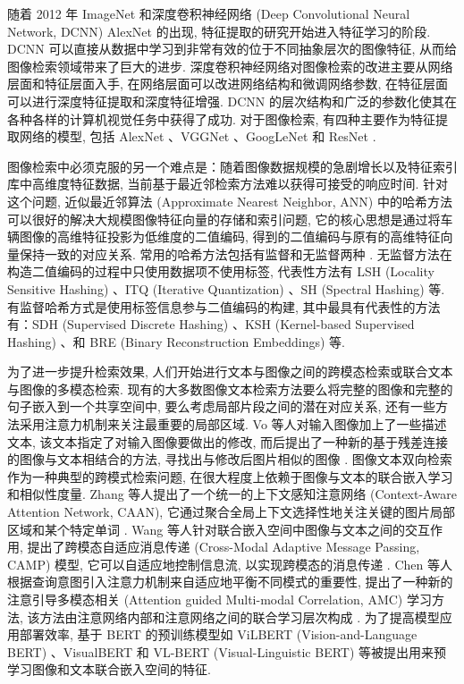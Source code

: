 \documentclass[12pt]{article}
\begin{document}
随着 2012 年 ImageNet 和深度卷积神经网络 (Deep Convolutional Neural Network, DCNN) AlexNet \cite{Krizhevsky2012Imagenet} 的出现, 特征提取的研究开始进入特征学习的阶段. DCNN 可以直接从数据中学习到非常有效的位于不同抽象层次的图像特征, 从而给图像检索领域带来了巨大的进步. 深度卷积神经网络对图像检索的改进主要从网络层面和特征层面入手, 在网络层面可以改进网络结构和微调网络参数, 在特征层面可以进行深度特征提取和深度特征增强. DCNN 的层次结构和广泛的参数化使其在各种各样的计算机视觉任务中获得了成功. 对于图像检索, 有四种主要作为特征提取网络的模型, 包括 AlexNet \cite{Krizhevsky2012Imagenet}、VGGNet \cite{Simonyan2014Very}、GoogLeNet \cite{Szegedy2015Going} 和 ResNet \cite{He2016Deep}. 

图像检索中必须克服的另一个难点是：随着图像数据规模的急剧增长以及特征索引库中高维度特征数据, 当前基于最近邻检索方法难以获得可接受的响应时间. 针对这个问题, 近似最近邻算法 (Approximate Nearest Neighbor, ANN) \cite{Arya1998Optimal} 中的哈希方法可以很好的解决大规模图像特征向量的存储和索引问题, 它的核心思想是通过将车辆图像的高维特征投影为低维度的二值编码, 得到的二值编码与原有的高维特征向量保持一致的对应关系. 常用的哈希方法包括有监督和无监督两种 \cite{Wang2017Survey}. 无监督方法在构造二值编码的过程中只使用数据项不使用标签, 代表性方法有 LSH (Locality Sensitive Hashing) \cite{Charikar2002Similarity}、ITQ (Iterative Quantization) \cite{Gong2012Iterative}、SH (Spectral Hashing) \cite{Weiss2008Spectral} 等. 有监督哈希方式是使用标签信息参与二值编码的构建, 其中最具有代表性的方法有：SDH (Supervised Discrete Hashing) \cite{Shen2015Supervised}、KSH (Kernel-based Supervised Hashing) \cite{Liu2012Supervised}、和 BRE (Binary Reconstruction Embeddings) \cite{Kulis2009Learning} 等. 

为了进一步提升检索效果, 人们开始进行文本与图像之间的跨模态检索或联合文本与图像的多模态检索. 现有的大多数图像文本检索方法要么将完整的图像和完整的句子嵌入到一个共享空间中, 要么考虑局部片段之间的潜在对应关系, 还有一些方法采用注意力机制来关注最重要的局部区域. Vo 等人对输入图像加上了一些描述文本, 该文本指定了对输入图像要做出的修改, 而后提出了一种新的基于残差连接的图像与文本相结合的方法, 寻找出与修改后图片相似的图像 \cite{Vo2019Composing}. 图像文本双向检索作为一种典型的跨模式检索问题, 在很大程度上依赖于图像与文本的联合嵌入学习和相似性度量. Zhang 等人提出了一个统一的上下文感知注意网络 (Context-Aware Attention Network, CAAN), 它通过聚合全局上下文选择性地关注关键的图片局部区域和某个特定单词 \cite{Zhang2020Context}. Wang 等人针对联合嵌入空间中图像与文本之间的交互作用, 提出了跨模态自适应消息传递 (Cross-Modal Adaptive Message Passing, CAMP) 模型, 它可以自适应地控制信息流, 以实现跨模态的消息传递 \cite{Wang2019CAMP}. Chen 等人根据查询意图引入注意力机制来自适应地平衡不同模式的重要性, 提出了一种新的注意引导多模态相关 (Attention guided Multi-modal Correlation, AMC) 学习方法, 该方法由注意网络内部和注意网络之间的联合学习层次构成 \cite{Chen2017AMC}. 为了提高模型应用部署效率, 基于 BERT \cite{Devlin2018BERT} 的预训练模型如 ViLBERT (Vision-and-Language BERT) \cite{Lu2019ViLBERT}、VisualBERT \cite{Su2019VL} 和 VL-BERT (Visual-Linguistic BERT) \cite{Li2019VisualBERT} 等被提出用来预学习图像和文本联合嵌入空间的特征. 
\end{document}
